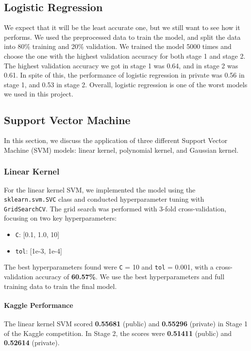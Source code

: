 \documentclass[10pt,a4paper]{article}
\begin{document}
\subsection{Logistic Regression}
We expect that it will be the least accurate one, but we still want to see how it performs.
We used the preprocessed data to train the model, and split the data into 80\% training and 20\% validation.
We trained the model 5000 times and choose the one with the highest validation accuracy for both stage 1 and stage 2.
The highest validation accuracy we got in stage 1 was 0.64, and in stage 2 was 0.61.
In spite of this, the performance of logistic regression in private was 0.56 in stage 1, and 0.53 in stage 2.
Overall, logistic regression is one of the worst models we used in this project.



\subsection{Support Vector Machine}
In this section, we discuss the application of three different Support Vector Machine (SVM) models: linear kernel, polynomial kernel, and Gaussian kernel.


\subsubsection{Linear Kernel}
For the linear kernel SVM, we implemented the model using the \texttt{sklearn.svm.SVC} class and conducted hyperparameter tuning with \texttt{GridSearchCV}. The grid search was performed with 3-fold cross-validation, focusing on two key hyperparameters:
\begin{itemize}
    \item \texttt{C}: [0.1, 1.0, 10]
    \item \texttt{tol}: [1e-3, 1e-4]
\end{itemize}
The best hyperparameters found were \texttt{C} = 10 and \texttt{tol} = 0.001, with a cross-validation accuracy of \textbf{60.57\%}. We use the best hyperparameters and full training data to train the final model.

\paragraph{Kaggle Performance}
The linear kernel SVM scored \textbf{0.55681} (public) and \textbf{0.55296} (private) in Stage 1 of the Kaggle competition. In Stage 2, the scores were \textbf{0.51411} (public) and \textbf{0.52614} (private).
\end{document}
